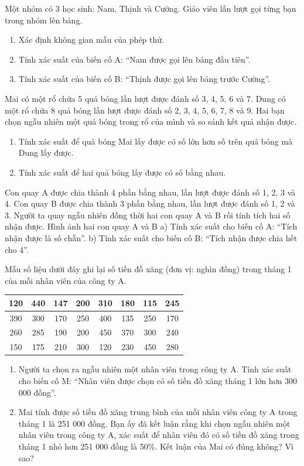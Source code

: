 \documentclass[%
    fontsize=12pt,%
    chapterprefix=false,%
    open=right,%
    twoside=false,%
    numbers=noenddot,%
    headings=optiontohead,%
    final,%
    DIV=15,%
    parskip=half %
]{scrbook}
\begin{document}
\begin{tuluan}
\item Một nhóm có 3 học sinh: Nam, Thịnh và Cường. Giáo viên lần lượt gọi từng bạn trong nhóm lên bảng.
\begin{enumerate}[label=\alph*)]
  \item[a)] Xác định không gian mẫu của phép thử.
  \item[b)] Tính xác suất của biến cố A: ``Nam được gọi lên bảng đầu tiên''.
  \item[c)] Tính xác suất của biến cố B: ``Thịnh được gọi lên bảng trước Cường''.
\end{enumerate}

\item Mai có một rổ chứa 5 quả bóng lần lượt được đánh số 3, 4, 5, 6 và 7. Dung có một rổ chứa 8 quả bóng lần lượt được đánh số 2, 3, 4, 5, 6, 7, 8 và 9. Hai bạn chọn ngẫu nhiên một quả bóng trong rổ của mình và so sánh kết quả nhận được.
\begin{enumerate}[label=\alph*)]
  \item[a)] Tính xác suất để quả bóng Mai lấy được có số lớn hơn số trên quả bóng mà Dung lấy được.
  \item[b)] Tính xác suất để hai quả bóng lấy được có số bằng nhau.
\end{enumerate}

\item Con quay A được chia thành 4 phần bằng nhau, lần lượt được đánh số 1, 2, 3 và 4. Con quay B được chia thành 3 phần bằng nhau, lần lượt được đánh số 1, 2 và 3. Người ta quay ngẫu nhiên đồng thời hai con quay A và B rồi tính tích hai số nhận được. Hình ảnh hai con quay A và B a) Tính xác suất cho biến cố A: ``Tích nhận được là số chẵn''. b) Tính xác suất cho biến cố B: ``Tích nhận được chia hết cho 4''.

\item Mẫu số liệu dưới đây ghi lại số tiền đồ xăng (đơn vị: nghìn đồng) trong tháng 1 của mỗi nhân viên của công ty A. \begin{tabular}{|c|c|c|c|c|c|c|c|} \hline 120 & 440 & 147 & 200 & 310 & 180 & 115 & 245 \\ \hline 390 & 300 & 170 & 250 & 400 & 135 & 250 & 170 \\ \hline 260 & 285 & 190 & 200 & 450 & 370 & 300 & 240 \\ \hline 150 & 175 & 210 & 300 & 120 & 230 & 450 & 280 \\ \hline \end{tabular}
\begin{enumerate}[label=\alph*)]
  \item[a)] Người ta chọn ra ngẫu nhiên một nhân viên trong công ty A. Tính xác suất cho biến cố M: ``Nhân viên được chọn có số tiền đồ xăng tháng 1 lớn hơn 300 000 đồng''.
  \item[b)] Mai tính được số tiền đồ xăng trung bình của mỗi nhân viên công ty A trong tháng 1 là 251 000 đồng. Bạn ấy đã kết luận rằng khi chọn ngẫu nhiên một nhân viên trong công ty A, xác suất để nhân viên đó có số tiền đồ xăng trong tháng 1 nhỏ hơn 251 000 đồng là 50\%. Kết luận của Mai có đúng không? Vì sao?
\end{enumerate}


\end{tuluan}
\end{document}

